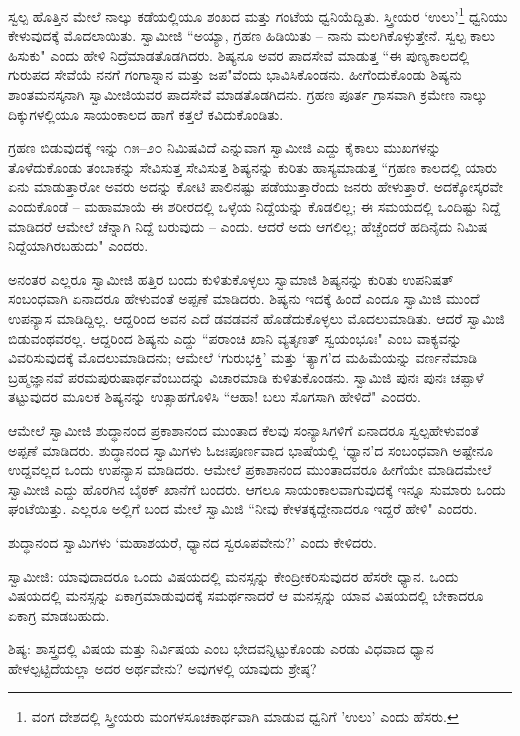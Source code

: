 ಸ್ವಲ್ಪ ಹೊತ್ತಿನ ಮೇಲೆ ನಾಲ್ಕು ಕಡೆಯಲ್ಲಿಯೂ ಶಂಖದ ಮತ್ತು ಗಂಟೆಯ ಧ್ವನಿಯೆದ್ದಿತು. ಸ್ತ್ರೀಯರ ‘ಉಲು’\footnote{ವಂಗ ದೇಶದಲ್ಲಿ ಸ್ತ್ರೀಯರು ಮಂಗಳಸೂಚಕಾರ್ಥವಾಗಿ ಮಾಡುವ ಧ್ವನಿಗೆ 'ಉಲು' ಎಂದು ಹೆಸರು.} ಧ್ವನಿಯು ಕೇಳುವುದಕ್ಕೆ ಮೊದಲಾಯಿತು. ಸ್ವಾಮೀಜಿ “ಅಯ್ಯಾ, ಗ್ರಹಣ ಹಿಡಿಯಿತು – ನಾನು ಮಲಗಿಕೊಳ್ಳುತ್ತೇನೆ. ಸ್ವಲ್ಪ ಕಾಲು ಹಿಸುಕು" ಎಂದು ಹೇಳಿ ನಿದ್ರೆಮಾಡತೊಡಗಿದರು. ಶಿಷ್ಯನೂ ಅವರ ಪಾದಸೇವೆ ಮಾಡುತ್ತ “ಈ ಪುಣ್ಯಕಾಲದಲ್ಲಿ ಗುರುಪದ ಸೇವೆಯೆ ನನಗೆ ಗಂಗಾಸ್ನಾನ ಮತ್ತು ಜಪ"ವೆಂದು ಭಾವಿಸಿಕೊಂಡನು. ಹೀಗೆಂದುಕೊಂಡು ಶಿಷ್ಯನು ಶಾಂತಮನಸ್ಕನಾಗಿ ಸ್ವಾಮೀಜಿಯವರ ಪಾದಸೇವೆ ಮಾಡತೊಡಗಿದನು. ಗ್ರಹಣ ಪೂರ್ತ ಗ್ರಾಸವಾಗಿ ಕ್ರಮೇಣ ನಾಲ್ಕು ದಿಕ್ಕುಗಳಲ್ಲಿಯೂ ಸಾಯಂಕಾಲದ ಹಾಗೆ ಕತ್ತಲೆ ಕವಿದುಕೊಂಡಿತು.

ಗ್ರಹಣ ಬಿಡುವುದಕ್ಕೆ ಇನ್ನು ೧೫–೨೦ ನಿಮಿಷವಿದೆ ಎನ್ನುವಾಗ ಸ್ವಾಮೀಜಿ ಎದ್ದು ಕೈಕಾಲು ಮುಖಗಳನ್ನು ತೊಳೆದುಕೊಂಡು ತಂಬಾಕನ್ನು ಸೇವಿಸುತ್ತ ಸೇವಿಸುತ್ತ ಶಿಷ್ಯನನ್ನು ಕುರಿತು ಹಾಸ್ಯಮಾಡುತ್ತ “ಗ್ರಹಣ ಕಾಲದಲ್ಲಿ ಯಾರು ಏನು ಮಾಡುತ್ತಾರೋ ಅವರು ಅದನ್ನು ಕೋಟಿ ಪಾಲಿನಷ್ಟು ಪಡೆಯುತ್ತಾರೆಂದು ಜನರು ಹೇಳುತ್ತಾರೆ. ಅದಕ್ಕೋಸ್ಕರವೇ ಎಂದುಕೊಂಡೆ – ಮಹಾಮಾಯೆ ಈ ಶರೀರದಲ್ಲಿ ಒಳ್ಳೆಯ ನಿದ್ದೆಯನ್ನು ಕೊಡಲಿಲ್ಲ; ಈ ಸಮಯದಲ್ಲಿ ಒಂದಿಷ್ಟು ನಿದ್ದೆ ಮಾಡಿದರೆ ಆಮೇಲೆ ಚೆನ್ನಾಗಿ ನಿದ್ದೆ ಬರುವುದು – ಎಂದು. ಆದರೆ ಅದು ಆಗಲಿಲ್ಲ; ಹೆಚ್ಚೆಂದರೆ ಹದಿನೈದು ನಿಮಿಷ ನಿದ್ದೆಯಾಗಿರಬಹುದು" ಎಂದರು.

ಅನಂತರ ಎಲ್ಲರೂ ಸ್ವಾಮೀಜಿ ಹತ್ತಿರ ಬಂದು ಕುಳಿತುಕೊಳ್ಳಲು ಸ್ವಾಮಾಜಿ ಶಿಷ್ಯನನ್ನು ಕುರಿತು ಉಪನಿಷತ್‌ ಸಂಬಂಧವಾಗಿ ಏನಾದರೂ ಹೇಳುವಂತೆ ಅಪ್ಪಣೆ ಮಾಡಿದರು. ಶಿಷ್ಯನು ಇದಕ್ಕೆ ಹಿಂದೆ ಎಂದೂ ಸ್ವಾಮಿಜಿ ಮುಂದೆ ಉಪನ್ಯಾಸ ಮಾಡಿದ್ದಿಲ್ಲ. ಆದ್ದರಿಂದ ಅವನ ಎದೆ ಡವಡವನೆ ಹೊಡೆದುಕೊಳ್ಳಲು ಮೊದಲುಮಾಡಿತು. ಆದರೆ ಸ್ವಾಮಿಜಿ ಬಿಡುವಂಥವರಲ್ಲ. ಆದ್ದರಿಂದ ಶಿಷ್ಯನು ಎದ್ದು “ಪರಾಂಚಿ ಖಾನಿ ವ್ಯತೃಣತ್ ಸ್ವಯಂಭೂಃ" ಎಂಬ ವಾಕ್ಯವನ್ನು ವಿವರಿಸುವುದಕ್ಕೆ ಮೊದಲುಮಾಡಿದನು; ಆಮೇಲೆ ‘ಗುರುಭಕ್ತಿ’ ಮತ್ತು ‘ತ್ಯಾಗ’ದ ಮಹಿಮೆಯನ್ನು ವರ್ಣನೆಮಾಡಿ ಬ್ರಹ್ಮಜ್ಞಾನವೆ ಪರಮಪುರುಷಾರ್ಥವೆಂಬುದನ್ನು ವಿಚಾರಮಾಡಿ ಕುಳಿತುಕೊಂಡನು. ಸ್ವಾಮಿಜಿ ಪುನಃ ಪುನಃ ಚಪ್ಪಾಳೆ ತಟ್ಟುವುದರ ಮೂಲಕ ಶಿಷ್ಯನನ್ನು ಉತ್ಸಾಹಗೊಳಿಸಿ “ಆಹಾ! ಬಲು ಸೊಗಸಾಗಿ ಹೇಳಿದೆ" ಎಂದರು.

ಆಮೇಲೆ ಸ್ವಾಮೀಜಿ ಶುದ್ಧಾನಂದ ಪ್ರಕಾಶಾನಂದ ಮುಂತಾದ ಕೆಲವು ಸಂನ್ಯಾಸಿಗಳಿಗೆ ಏನಾದರೂ ಸ್ವಲ್ಪಹೇಳುವಂತೆ ಅಪ್ಪಣೆ ಮಾಡಿದರು. ಶುದ್ಧಾನಂದ ಸ್ವಾಮಿಗಳು ಓಜಃಪೂರ್ಣವಾದ ಭಾಷೆಯಲ್ಲಿ ‘ಧ್ಯಾನ’ದ ಸಂಬಂಧವಾಗಿ ಅಷ್ಟೇನೂ ಉದ್ದವಲ್ಲದ ಒಂದು ಉಪನ್ಯಾಸ ಮಾಡಿದರು. ಆಮೇಲೆ ಪ್ರಕಾಶಾನಂದ ಮುಂತಾದವರೂ ಹೀಗೆಯೇ ಮಾಡಿದಮೇಲೆ ಸ್ವಾಮೀಜಿ ಎದ್ದು ಹೊರಗಿನ ಬೈಠಕ್ ಖಾನೆಗೆ ಬಂದರು. ಆಗಲೂ ಸಾಯಂಕಾಲವಾಗುವುದಕ್ಕೆ ಇನ್ನೂ ಸುಮಾರು ಒಂದು ಘಂಟೆಯಿತ್ತು. ಎಲ್ಲರೂ ಅಲ್ಲಿಗೆ ಬಂದ ಮೇಲೆ ಸ್ವಾಮಿಜಿ “ನೀವು ಕೇಳತಕ್ಕದ್ದೇನಾದರೂ ಇದ್ದರೆ ಹೇಳಿ" ಎಂದರು.

ಶುದ್ಧಾನಂದ ಸ್ವಾಮಿಗಳು ‘ಮಹಾಶಯರೆ, ಧ್ಯಾನದ ಸ್ವರೂಪವೇನು?’ ಎಂದು ಕೇಳಿದರು.

ಸ್ವಾಮೀಜಿ: ಯಾವುದಾದರೂ ಒಂದು ವಿಷಯದಲ್ಲಿ ಮನಸ್ಸನ್ನು ಕೇಂದ್ರೀಕರಿಸುವುದರ ಹೆಸರೇ ಧ್ಯಾನ. ಒಂದು ವಿಷಯದಲ್ಲಿ ಮನಸ್ಸನ್ನು ಏಕಾಗ್ರಮಾಡುವುದಕ್ಕೆ ಸಮರ್ಥನಾದರೆ ಆ ಮನಸ್ಸನ್ನು ಯಾವ ವಿಷಯದಲ್ಲಿ ಬೇಕಾದರೂ ಏಕಾಗ್ರ ಮಾಡಬಹುದು.

ಶಿಷ್ಯ: ಶಾಸ್ತ್ರದಲ್ಲಿ ವಿಷಯ ಮತ್ತು ನಿರ್ವಿಷಯ ಎಂಬ ಭೇದವನ್ನಿಟ್ಟುಕೊಂಡು ಎರಡು ವಿಧವಾದ ಧ್ಯಾನ ಹೇಳಲ್ಪಟ್ಟಿದೆಯಲ್ಲಾ ಅದರ ಅರ್ಥವೇನು? ಅವುಗಳಲ್ಲಿ ಯಾವುದು ಶ್ರೇಷ್ಠ?

